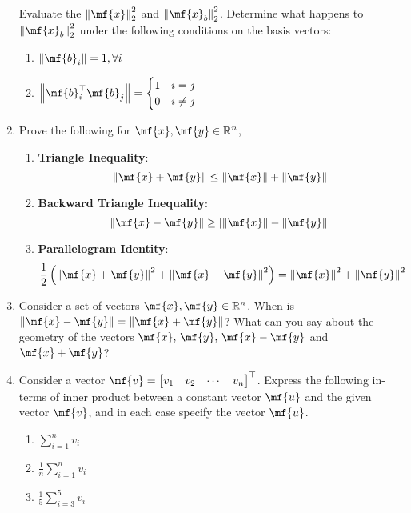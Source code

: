 \begin{enumerate}
    Evaluate the $\left\lVert \mf{x}\right\rVert_2^2$ and $\left\lVert \mf{x}_b\right\rVert_2^2$. Determine what happens to $\left\lVert \mf{x}_b\right\rVert_2^2$ under the following conditions on the basis vectors:
    \begin{enumerate}
        \item $\left\lVert \mf{b}_i\right\rVert = 1, \forall i$
        \item $\left\lVert \mf{b}_i^\top\mf{b}_j\right\rVert = \begin{cases}
        1 & i = j\\
        0 & i \neq j
        \end{cases}$
    \end{enumerate}

    \item Prove the following for $\mf{x}, \mf{y} \in \mathbb{R}^n$,
    \begin{enumerate}
        \item {\small \textbf{Triangle Inequality}}:
        \[ \left\lVert \mf{x} + \mf{y}\right\rVert \leq \left\lVert \mf{x}\right\rVert + \left\lVert \mf{y}\right\rVert \]
        \item {\small \textbf{Backward Triangle Inequality}}:
        \[ \left\lVert \mf{x} - \mf{y}\right\rVert  \geq \left\lvert \left\lVert \mf{x}\right\rVert - \left\lVert \mf{y}\right\rVert \right\rvert \]
        \item {\small \textbf{Parallelogram Identity}}:
        \[ \frac{1}{2} \left(\left\lVert \mf{x} + \mf{y}\right\rVert^2 + \left\lVert \mf{x} - \mf{y}\right\rVert^2 \right) = \left\lVert \mf{x}\right\rVert^2 + \left\lVert \mf{y}\right\rVert^2 \]
    \end{enumerate}

    \item Consider a set of vectors $\mf{x}, \mf{y} \in \mathbb{R}^n$. When is $\left\lVert \mf{x} - \mf{y} \right\rVert = \left\lVert \mf{x} + \mf{y}\right\rVert$? What can you say about the geometry of the vectors $\mf{x},\,\mf{y},\,\mf{x} - \mf{y}$ and $\mf{x} + \mf{y}$? 
    
    \item Consider a vector $\mf{v} = \begin{bmatrix*}v_1 & v_2 & \cdots & v_n\end{bmatrix*}^\top$. Express the following in-terms of inner product between a constant vector $\mf{u}$ and the given vector $\mf{v}$, and in each case specify the vector $\mf{u}$.
    \begin{enumerate}
        \item $\sum_{i=1}^n v_i$
        \item $\frac{1}{n}\sum_{i=1}^n v_i$
        \item $\frac{1}{5}\sum_{i=3}^5 v_i$
    \end{enumerate} 
    

\end{enumerate}
